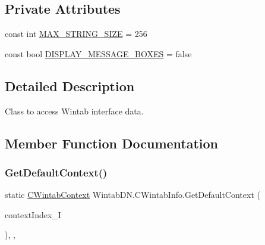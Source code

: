 \subsection*{Private Attributes}
\begin{DoxyCompactItemize}
\item 
const int \mbox{\hyperlink{class_wintab_d_n_1_1_c_wintab_info_a92d6a4a3e03345f0c62c25b6fcae1fe2}{M\+A\+X\+\_\+\+S\+T\+R\+I\+N\+G\+\_\+\+S\+I\+ZE}} = 256
\item 
const bool \mbox{\hyperlink{class_wintab_d_n_1_1_c_wintab_info_a0fe429a15660c87135a11176b74172ee}{D\+I\+S\+P\+L\+A\+Y\+\_\+\+M\+E\+S\+S\+A\+G\+E\+\_\+\+B\+O\+X\+ES}} = false
\end{DoxyCompactItemize}


\subsection{Detailed Description}
Class to access Wintab interface data. 



\subsection{Member Function Documentation}
\mbox{\label{class_wintab_d_n_1_1_c_wintab_info_ae86f7d8d0acf12b0ebd3cd25cb24e6c2}} 
\subsubsection{\texorpdfstring{Get\+Default\+Context()}{GetDefaultContext()}}
{\footnotesize\ttfamily static \mbox{\hyperlink{class_wintab_d_n_1_1_c_wintab_context}{C\+Wintab\+Context}} Wintab\+D\+N.\+C\+Wintab\+Info.\+Get\+Default\+Context (\begin{DoxyParamCaption}\item[{\mbox{\hyperlink{namespace_wintab_d_n_aeb27579e91c95fb5a7bf4a4a9dc7f875}{E\+W\+T\+I\+Category\+Index}}}]{context\+Index\+\_\+I }\end{DoxyParamCaption})\hspace{0.3cm}{\ttfamily [inline]}, {\ttfamily [static]}, {\ttfamily [private]}}



